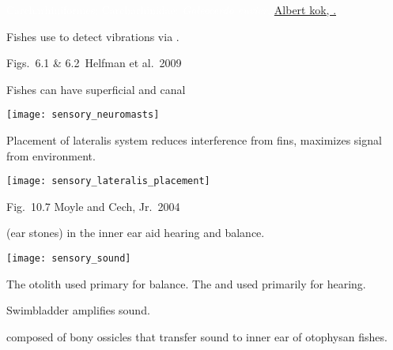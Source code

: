 \label{key}\documentclass[t]{beamer}
\begin{document}

{
\begin{frame}

\vfill

\tinyfill\textcolor{white}{Carcharhiniformes: Carcharhinidae: \textit{Galeocerdo cuvier,} \href{https://commons.wikimedia.org/w/index.php?curid=7737291}{Albert kok, .}}

\end{frame}
}

{
\begin{frame}[t]{Fishes use  to detect vibrations via .}


\vfilll

\tinyfill Figs.~6.1 \& 6.2 \textcopyright\,Helfman et al.~2009

\end{frame}
}


\begin{frame}[t]{Fishes can have superficial and canal }

\texttt{[image: sensory\_neuromasts]}

\end{frame}


\begin{frame}[t]{Placement of lateralis system reduces interference from fins, maximizes signal from environment.}

\texttt{[image: sensory\_lateralis\_placement]}

\vfilll

\tinyfill Fig.~10.7 Moyle and Cech, Jr.~2004
\end{frame}


\begin{frame}[t]{ (ear stones) in the inner ear aid hearing and balance.}

\vspace{-\baselineskip}
\begin{multicols}{2}

\texttt{[image: sensory\_sound]}

\columnbreak

The  otolith used primary for balance. The  and  used primarily for hearing.

\vspace{3\baselineskip}

Swimbladder amplifies sound.

\vspace{3\baselineskip}

 composed of bony ossicles that transfer sound to inner ear of otophysan fishes.

\end{multicols}

\end{frame}
\end{document}

